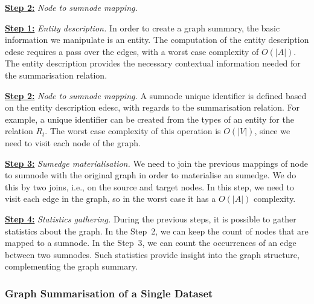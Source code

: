 \begin{labeling}{\textbf{\underline{Step 2:}} \emph{Node to sumnode mapping.}}
	\item[\textbf{\underline{Step 1:}} \emph{Entity description.}]
	\label{step-ed}
	In order to create a graph summary, the basic information we manipulate is an entity. The computation of the entity description \gls{edesc} requires a pass over the edges, with a worst case complexity of $O(\vert A \vert)$. The entity description provides the necessary contextual information needed for the summarisation relation.
	
	\item[\textbf{\underline{Step 2:}} \emph{Node to sumnode mapping.}]
	\label{step-hn}
	A sumnode unique identifier is defined based on the entity description \gls{edesc}, with regards to the summarisation relation.
	For example, a unique identifier can be created from the types of an entity for the relation $R_t$.
	The worst case complexity of this operation is $O(\vert V \vert)$, since we need to visit each node of the graph.
	
	\item[\textbf{\underline{Step 3:}} \emph{Sumedge materialisation.}]
	\label{step-he}
	We need to join the previous mappings of node to sumnode with the original graph in order to materialise an sumedge. We do this by two joins, i.e., on the source and target nodes. In this step, we need to visit each edge in the graph, so in the worst case it has a $O\left(\vert A \vert\right)$ complexity.
	
	\item[\textbf{\underline{Step 4:}} \emph{Statistics gathering.}]
	\label{step-stats}
	During the previous steps, it is possible to gather statistics about the graph. In the Step~2, we can keep the count of nodes that are mapped to a sumnode. In the Step~3, we can count the occurrences of an edge between two sumnodes. Such statistics provide insight into the graph structure, complementing the graph summary.
\end{labeling}

\subsubsection{Graph Summarisation of a Single Dataset}

